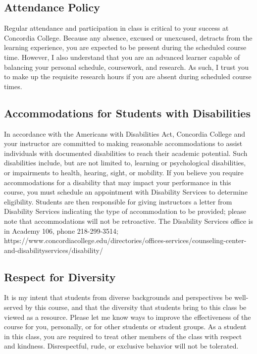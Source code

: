 \documentclass{tufte-handout}
\begin{document}
\begin{fullwidth}

\subsection{Attendance Policy}

Regular attendance and participation in class is critical to your success at Concordia College. Because any absence, excused or unexcused, detracts from the learning experience, you are expected to be present during the scheduled course time. However, I also understand that you are an advanced learner capable of balancing your personal schedule, coursework, and research. As such, I trust you to make up the requisite research hours if you are absent during scheduled course times. 


\subsection{Accommodations for Students with Disabilities}

In accordance with the Americans with Disabilities Act, Concordia College and your instructor are committed to making reasonable accommodations to assist individuals with documented disabilities to reach their academic potential. Such disabilities include, but are not limited to, learning or psychological disabilities, or impairments to health, hearing, sight, or mobility. If you believe you require accommodations for a disability that may impact your performance in this course, you must schedule an appointment with Disability Services to determine eligibility. Students are then responsible for giving instructors a letter from Disability Services indicating the type of accommodation to be provided; please note that accommodations will not be retroactive. The Disability Services office is in Academy 106, phone 218-299-3514; https://www.concordiacollege.edu/directories/offices-services/counseling-center-and-disabilityservices/disability/ 


\subsection{Respect for Diversity}

It is my intent that students from diverse backgrounds and perspectives be well-served by this course, and that the diversity that students bring to this class be viewed as a resource. Please let me know ways to improve the effectiveness of the course for you, personally, or for other students or student groups. As a student in this class, you are required to treat other members of the class with respect and kindness. Disrespectful, rude, or exclusive behavior will not be tolerated.


\end{fullwidth}
\end{document}
